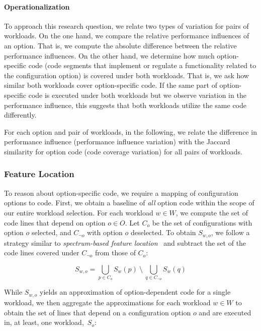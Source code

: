 {\paragraph*{Operationalization}
To approach this research question, we relate two types of variation for pairs of workloads. On the one hand, we compare the relative performance influences of an option. That is, we compute the absolute difference between the relative performance influences. On the other hand, we determine how much option-specific code (code segments that implement or regulate a functionality related to the configuration option) is covered under both workloads. That is, we ask how similar both workloads cover option-specific code. If the same part of option-specific code is executed under both workloads but we observe variation in the performance influence, this suggests that both workloads utilize the same code differently.



For each option and pair of workloads, in the following, we relate the difference in performance influence (performance influence variation) with the Jaccard similarity for option code (code coverage variation) for all pairs of workloads.

\subsubsection{Feature Location}
To reason about option-specific code, we require a mapping of configuration options to code. First, we obtain a baseline of \textit{all} option code within the scope of our entire workload selection. For each workload $w \in W$, we compute the set of code lines that depend on option $o \in O$. Let $C_{o}$ be the set of configurations with option $o$ selected, and $C_{\neg o}$ with option $o$ deselected. To obtain $S_{w, o}$, we follow a strategy similar to \textit{spectrum-based feature location}~\cite{michelon_spectrum_2021} and subtract the set of the code lines covered under $C_{\neg o}$ from those of $C_{o}$:

\begin{equation}%
	S_{w, o} = \bigcup_{p \in C_{o}} S_{w}(p) ~ \setminus ~ \bigcup_{q \in C_{\neg o}} S_{w}(q)
\end{equation}

While $S_{w, o}$ yields an approximation of option-dependent code for a single workload, we then aggregate the approximations for each workload $w\in W$ to obtain the set of lines that depend on a configuration option $o$ and are executed in, at least, one workload,~$S_{o}$: 

}
